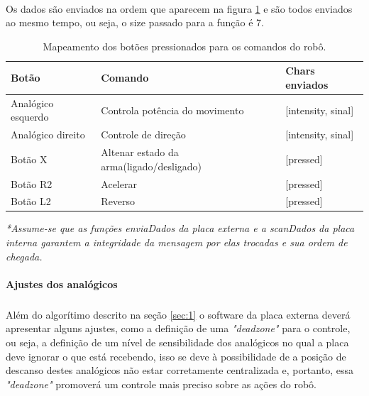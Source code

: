 \documentclass{article}
\begin{document}
                \paragraph{}
                Os dados são enviados na ordem que aparecem na figura \ref{tab:1} e são todos enviados ao mesmo tempo, ou seja, o size passado para a função é 7.
                \begin{table}[H]
                    \centering
                    \caption{Mapeamento dos botões pressionados para os comandos do robô.}
                    \label{tab:1}
                    \begin{tabular}{|l|l|l|}
                    \hline
                    Botão              & Comando                                  & Chars  enviados             \\ \hline
                    Analógico esquerdo & Controla potência do movimento           & {[}intensity, sinal{]}          \\
                    Analógico direito  & Controle de direção                      & {[}intensity, sinal{]}          \\
                    Botão X            & Altenar estado da arma(ligado/desligado) & {[}pressed{]}                   \\
                    Botão R2           & Acelerar                                 & {[}pressed{]}                   \\
                    Botão L2           & Reverso                                  & {[}pressed{]}                   \\ \hline
                    \end{tabular}
                \end{table}
                \textit{*Assume-se que as funções enviaDados da placa externa e a scanDados da placa interna garantem a integridade da mensagem por elas trocadas e sua ordem de chegada.}

                \paragraph{Ajustes dos analógicos}
                \subparagraph{}
                Além do algorítimo descrito na seção \ref{sec:1} o software da placa externa deverá apresentar alguns ajustes, como a definição de uma \textit{"deadzone"} para o controle, ou seja, a definição de um nível de sensibilidade dos analógicos no qual a placa deve ignorar o que está recebendo, isso se deve à possibilidade de a posição de descanso destes analógicos não estar corretamente centralizada e, portanto, essa \textit{"deadzone"} promoverá um controle mais preciso sobre as ações do robô.
\end{document}
